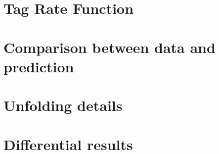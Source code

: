 \chapter{Tag Rate Function}
\label{app:trf}



\chapter{Comparison between data and prediction}
\label{app:selection}



\chapter{Unfolding details}
\label{app:unfolding}



\chapter{Differential results}
\label{app:correlations}


